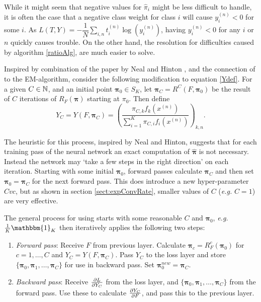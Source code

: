 While it might seem that negative values for \( \hat{\pi}_i \) might be less difficult to handle, it is often the case that a negative class weight for class \( i \) will cause \( y^{(n)}_i<0 \) for some \( i \).  As \( L(T,Y) = -\dfrac{1}{N} \sum_{i,n} t^{(n)}_i \log(y^{(n)}_i) \), having \( y^{(n)}_i<0 \)  for any \( i \) or \( n \) quickly causes trouble.  On the other hand, the resolution for difficulties caused by \DR algorithm \ref{ratioAlg}, are much easier to solve.

Inspired by combination of the paper by Neal and Hinton \cite{NealHintonEM1999}, and the connection of \DR to the EM-algorithm, consider the following modification to equation \ref{Ydef}.  For a given \( C\in\mathbb N \), and an initial point \( \bm\pi_0 \in S_K \), let \( \bm\pi_C = R^{C}(F,\bm \pi_0) \) be the result of \( C \) iterations  of \( R_F(\bm\pi) \) starting at \( \pi_0 \).  Then define 
\begin{equation}\label{eqn:YcDef}
Y_C = Y(F,\bm\pi_C)=\left(\dfrac{\pi_{C,k} f_k(x^{(n)})}{\sum_{i=1}^{K}\pi_{C,i} f_i(x^{(n)})}\right)_{k,n}.
\end{equation}

The heuristic for this process, inspired by Neal and Hinton, suggests that for each training pass of the neural network an exact computation of \( \hat{\bm\pi} \) is not necessary.  Instead the network may `take a few steps in the right direction' on each iteration.  Starting with some initial \( \bm\pi_0 \), forward passes calculate \( \bm\pi_C \) and then set \( \bm\pi_0 =\bm\pi_C \) for the next forward pass.  This does introduce a new hyper-parameter \( Cvc \), but as shown in section \ref{sect:expConvRate}, smaller values of \( C \) (\textit{e.g.} \( C=1 \)) are very effective.

The general process for using \RS starts with some reasonable \( C \) and \( \bm\pi_0 \), \textit{e.g.} \(\frac 1K \mathbbm{1}_K  \) then iteratively applies the following two steps:
\begin{enumerate}
	\item \textit{Forward pass}: Receive \( F \) from previous layer. Calculate \( \bm\pi_c = R^c_F(\bm\pi_0) \) for \( c=1,\ldots, C \) and \( Y_C = Y(F,\bm\pi_C) \). Pass \( Y_C \) to the loss layer and store \( \{\bm\pi_0,\bm\pi_1,\ldots,\bm\pi_C\} \) for use in backward pass. Set \( \bm\pi_0^{new} = \bm\pi_C \).
	\item \textit{Backward pass}: Receive \( \pdv{L}{Y_C} \) from the loss layer, and \( \{\bm\pi_0,\bm\pi_1,\ldots,\bm\pi_C\} \) from  the forward pass.  Use these to calculate \( \pdv{Y_C}{F} \), and pass this to the previous layer.
\end{enumerate}

